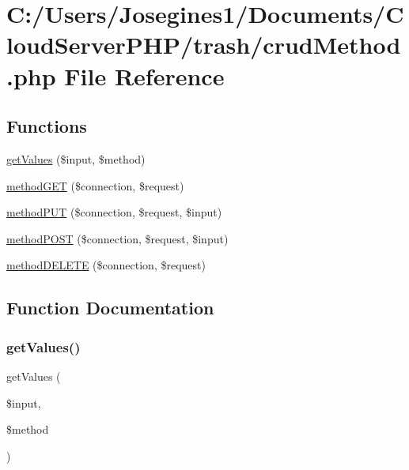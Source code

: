 \hypertarget{crud_method_8php}{}\section{C\+:/\+Users/\+Josegines1/\+Documents/\+Cloud\+Server\+P\+H\+P/trash/crud\+Method.php File Reference}
\label{crud_method_8php}
\subsection*{Functions}
\begin{DoxyCompactItemize}
\item 
\mbox{\hyperlink{crud_method_8php_a7c62062da4254aba9caaed07236db646}{get\+Values}} (\$input, \$method)
\item 
\mbox{\hyperlink{crud_method_8php_a3f8c85af09dddef6e14bd0ea75401d8d}{method\+G\+ET}} (\$connection, \$request)
\item 
\mbox{\hyperlink{crud_method_8php_a900949fd105f15a37b23c83894131d8b}{method\+P\+UT}} (\$connection, \$request, \$input)
\item 
\mbox{\hyperlink{crud_method_8php_a558300dda434f376241f7d70a2595ee5}{method\+P\+O\+ST}} (\$connection, \$request, \$input)
\item 
\mbox{\hyperlink{crud_method_8php_ae6cadce380cfc217059b21886e8b875b}{method\+D\+E\+L\+E\+TE}} (\$connection, \$request)
\end{DoxyCompactItemize}


\subsection{Function Documentation}
\mbox{\label{crud_method_8php_a7c62062da4254aba9caaed07236db646}} 
\subsubsection{\texorpdfstring{get\+Values()}{getValues()}}
{\footnotesize\ttfamily get\+Values (\begin{DoxyParamCaption}\item[{}]{\$input,  }\item[{}]{\$method }\end{DoxyParamCaption})}

